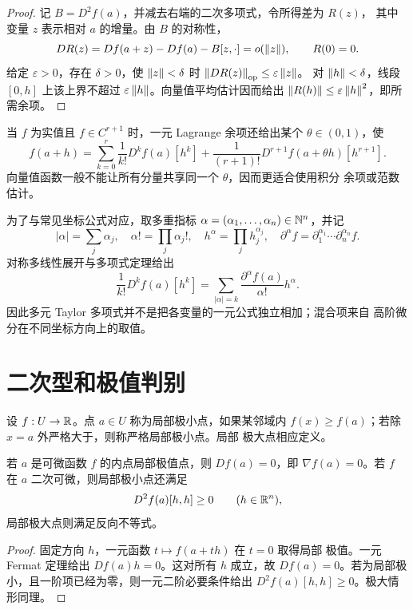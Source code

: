 \begin{proof}
记 \(B=D^2f(a)\)，并减去右端的二次多项式，令所得差为 \(R(z)\)，
其中变量 \(z\) 表示相对 \(a\) 的增量。由 \(B\) 的对称性，
\[
 DR(z)=Df(a+z)-Df(a)-B[z,\cdot]=o(\left\lVert z\right\rVert),\qquad R(0)=0.
\]
给定 \(\varepsilon>0\)，存在 \(\delta>0\)，使
\(\left\lVert z\right\rVert<\delta\) 时 \(\left\lVert DR(z)\right\rVert_{\mathrm{op}}\le\varepsilon\left\lVert z\right\rVert\)。
对 \(\left\lVert h\right\rVert<\delta\)，线段 \([0,h]\) 上该上界不超过
\(\varepsilon\left\lVert h\right\rVert\)。向量值平均估计因而给出
\(\left\lVert R(h)\right\rVert\le\varepsilon\left\lVert h\right\rVert^2\)，即所需余项。
\end{proof}

当 \(f\) 为实值且 \(f\in C^{r+1}\) 时，一元 Lagrange 余项还给出某个
\(\theta\in(0,1)\)，使
\[
 f(a+h)=\sum_{k=0}^r\frac1{k!}D^kf(a)[h^k]
 +\frac1{(r+1)!}D^{r+1}f(a+\theta h)[h^{r+1}].
\]
向量值函数一般不能让所有分量共享同一个 \(\theta\)，因而更适合使用积分
余项或范数估计。

为了与常见坐标公式对应，取多重指标
\(\alpha=(\alpha_1,\ldots,\alpha_n)\in\mathbb{N}^n\)，并记
\[
 |\alpha|=\sum_j\alpha_j,
 \quad
 \alpha!=\prod_j\alpha_j!,
 \quad
 h^\alpha=\prod_jh_j^{\alpha_j},
 \quad
 \partial^\alpha f
 =\partial_1^{\alpha_1}\cdots\partial_n^{\alpha_n}f.
\]
对称多线性展开与多项式定理给出
\[
 \frac1{k!}D^kf(a)[h^k]
 =\sum_{|\alpha|=k}\frac{\partial^\alpha f(a)}{\alpha!}h^\alpha.
\]
因此多元 Taylor 多项式并不是把各变量的一元公式独立相加；混合项来自
高阶微分在不同坐标方向上的取值。

\section{二次型和极值判别}

设 \(f:U\to\mathbb{R}\)。点 \(a\in U\) 称为局部极小点，如果某邻域内
\(f(x)\ge f(a)\)；若除 \(x=a\) 外严格大于，则称严格局部极小点。局部
极大点相应定义。

\begin{theorem}[一阶与二阶必要条件]
\label{thm:unconstrained-extremum-necessary}
若 \(a\) 是可微函数 \(f\) 的内点局部极值点，则 \(Df(a)=0\)，即
\(\nabla f(a)=0\)。若 \(f\) 在 \(a\) 二次可微，则局部极小点还满足
\[
 D^2f(a)[h,h]\ge0\qquad(h\in\mathbb{R}^n),
\]
局部极大点则满足反向不等式。
\end{theorem}

\begin{proof}
固定方向 \(h\)，一元函数 \(t\mapsto f(a+th)\) 在 \(t=0\) 取得局部
极值。一元 Fermat 定理给出 \(Df(a)h=0\)。这对所有 \(h\) 成立，故
\(Df(a)=0\)。若为局部极小，且一阶项已经为零，则一元二阶必要条件给出
\(D^2f(a)[h,h]\ge0\)。极大情形同理。
\end{proof}

